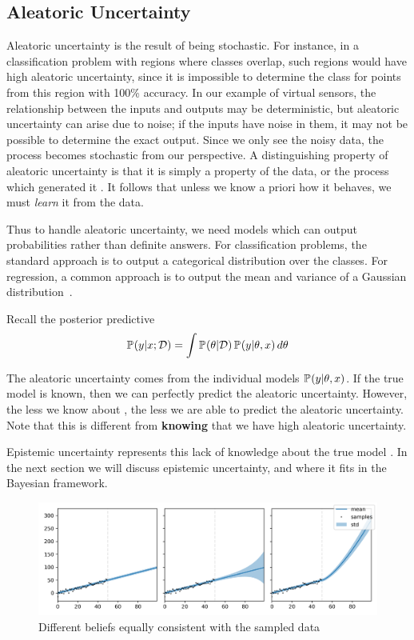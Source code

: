 \documentclass[../main.tex]{subfiles}
\begin{document}
\subsection{Aleatoric Uncertainty}
\label{subsec:aleatoric}
Aleatoric uncertainty is the result of  being stochastic. For instance, in a classification problem with regions where classes overlap, such regions would have high aleatoric uncertainty, since it is impossible to determine the class for points from this region with 100\% accuracy. In our example of virtual sensors, the relationship between the inputs and outputs may be deterministic, but aleatoric uncertainty can arise due to noise; if the inputs have noise in them, it may not be possible to determine the exact output. Since we only see the noisy data, the process becomes stochastic from our perspective.
A distinguishing property of aleatoric uncertainty is that it is simply a property of the data, or the process which generated it . It follows that unless we know a priori how it behaves, we must \emph{learn} it from the data. 

Thus to handle aleatoric uncertainty, we need models which can output probabilities rather than definite answers. For classification problems, the standard approach is to output a categorical distribution over the classes. For regression, a common approach is to output the mean and variance of a Gaussian distribution~\citep{kendall2017uncertainties, goodfellow2016deep}. 

Recall the posterior predictive 
$$
    \mathbb{P}_{}(y|x; \mathcal{D})=  \int \mathbb{P}_{}(\theta | \mathcal{D})\, \mathbb{P}_{}(y|\theta, x) \, d\theta
$$

The aleatoric uncertainty comes from the individual models $\mathbb{P}_{}(y|\theta, x)$. If the true model  is known, then we can perfectly predict the aleatoric uncertainty. However, the less we know about , the less we are able to predict the aleatoric uncertainty. Note that this is different from \textbf{knowing} that we have high aleatoric uncertainty. 

Epistemic uncertainty represents this lack of knowledge about the true model . In the next section we will discuss epistemic uncertainty, and where it fits in the Bayesian framework. 

\begin{figure}
    \centering
    \includegraphics[width=1\textwidth]{Background/uncertainty_beliefs.png}
    \caption{Different beliefs equally consistent with the sampled data}
    \label{fig:uncertainty_toy}
\end{figure}
\end{document}
